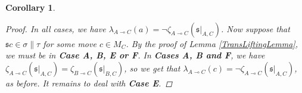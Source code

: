 \documentclass[11pt]{article} %
\theoremstyle{plain} %
\newtheorem{corollary}[theorem]{Corollary}
\theoremstyle{definition} %
\theoremstyle{note}
\theoremstyle{exercisestyle}
\renewcommand{\implies}{\multimap}
\newcommand{\s}{\mathfrak s}
\begin{document}
\begin{corollary}
\begin{proof}
    In all cases, we have $\lambda_{A\implies C}(a)=\neg\zeta_{A\implies C}(\s\vert_{A,C})$.  Now suppose that $\s c\in\sigma\|\tau$ for some move $c\in M_C$.  By the proof of Lemma \ref{TransLiftingLemma}, we must be in \textbf{Case A, B, E or F}.  In \textbf{Cases A, B and F}, we have $\zeta_{A\implies C}(\s\vert_{A,C})=\zeta_{B\implies C}(\s\vert_{B,C})$, so we get that $\lambda_{A\implies C}(c)=\neg\zeta_{A\implies C}(\s\vert_{A,C})$, as before.  It remains to deal with \textbf{Case E}.  
  \end{proof}
\end{corollary}



\end{document}
